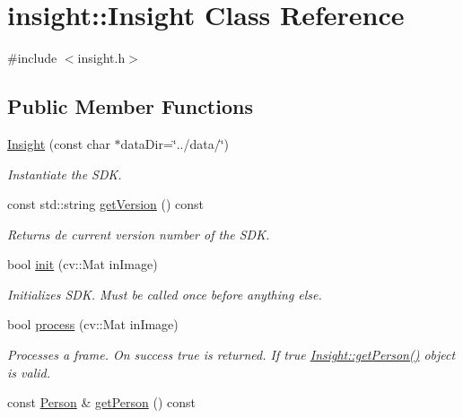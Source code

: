 \hypertarget{classinsight_1_1Insight}{}\section{insight\+:\+:Insight Class Reference}
\label{classinsight_1_1Insight}


{\ttfamily \#include $<$insight.\+h$>$}

\subsection*{Public Member Functions}
\begin{DoxyCompactItemize}
\item 
\hyperlink{classinsight_1_1Insight_ae30c4167f13a77370aa63f108419295a}{Insight} (const char $\ast$data\+Dir=\char`\"{}../data/\char`\"{})
\begin{DoxyCompactList}\small\item\em Instantiate the S\+DK. \end{DoxyCompactList}\item 
const std\+::string \hyperlink{classinsight_1_1Insight_aa27588fb9962e7c228a93637ee106978}{get\+Version} () const \hypertarget{classinsight_1_1Insight_aa27588fb9962e7c228a93637ee106978}{}\label{classinsight_1_1Insight_aa27588fb9962e7c228a93637ee106978}

\begin{DoxyCompactList}\small\item\em Returns de current version number of the S\+DK. \end{DoxyCompactList}\item 
bool \hyperlink{classinsight_1_1Insight_af6aaa16c4eae044bcc104ec1ae321225}{init} (cv\+::\+Mat in\+Image)\hypertarget{classinsight_1_1Insight_af6aaa16c4eae044bcc104ec1ae321225}{}\label{classinsight_1_1Insight_af6aaa16c4eae044bcc104ec1ae321225}

\begin{DoxyCompactList}\small\item\em Initializes S\+DK. Must be called once before anything else. \end{DoxyCompactList}\item 
bool \hyperlink{classinsight_1_1Insight_a5774b1b17b29d1b23186ea383d771b7c}{process} (cv\+::\+Mat in\+Image)\hypertarget{classinsight_1_1Insight_a5774b1b17b29d1b23186ea383d771b7c}{}\label{classinsight_1_1Insight_a5774b1b17b29d1b23186ea383d771b7c}

\begin{DoxyCompactList}\small\item\em Processes a frame. On success true is returned. If true \hyperlink{classinsight_1_1Insight_a48f4996b01968c94e8aa34bf2fadf946}{Insight\+::get\+Person()} object is valid. \end{DoxyCompactList}\item 
const \hyperlink{classinsight_1_1Person}{Person} \& \hyperlink{classinsight_1_1Insight_a48f4996b01968c94e8aa34bf2fadf946}{get\+Person} () const \hypertarget{classinsight_1_1Insight_a48f4996b01968c94e8aa34bf2fadf946}{}\label{classinsight_1_1Insight_a48f4996b01968c94e8aa34bf2fadf946}


\end{DoxyCompactItemize}

